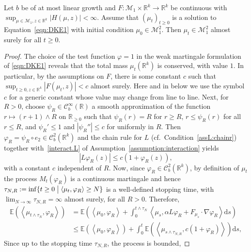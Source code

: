 \documentclass[10pt,a4paper]{amsart}
\newcommand{\C}{\mathcal C}
\newcommand{\E}{\mathbb{E}}
\newcommand{\F}{F}
\newcommand{\R}{\mathbb{R}}
\newcommand{\av}[1]{\left<#1\right>}
\newcommand{\cM}{\mathcal M}
\newcommand{\dd}{\text{d}}
\begin{document}
\begin{lemma}
  \label{lemma:secondmoment}
  Let $b$ be of at most linear growth and $\F\colon\mathcal M_1 \times \R^k \to \R^k$ be continuous with
  $\sup_{\mu \in \mathcal M_1, z \in \R^k} |H(\mu,z)| < \infty$.  Assume that $(\mu_t)_{t \geq 0}$ is a
  solution to Equation~\eqref{eqn:DKE1} with initial condition $\mu_0 \in \cM^2_1$. Then $\mu_t \in \cM^2_1$
  almost surely for all $t \geq 0$.
\end{lemma}

\begin{proof} The choice of the test function $\varphi =1$ in the weak martingale formulation of
  \eqref{eqn:DKE1} reveals that the total mass $\mu_t(\R^k)$ is conserved, with value $1$. In particular, by
  the assumptions on $F$, there is some constant $c$ such that $\sup_{t\geq 0, z \in \R^k} |F(\mu_t,z)| <c$
  almost surely. Here and in below we use the symbol $c$ for a generic constant whose value may change from
  line to line. Next, for $R > 0$, choose $\psi_R \in \C^\infty_b(\R)$ a smooth approximation of the function
  $ r \mapsto (r+1) \wedge R$ on $\R_{\geq 0}$ such that $\psi_R(r) = R$ for $r \geq R$, $r \leq \psi_R(r)$
  for all $r \leq R$, and $ \psi_R' \leq 1$ and $ |\psi_R''| \leq c $ for uniformly in $R$.  Then
  $\varphi_R = \psi_R \circ e_2 \in \C^2_b(\R^k)$ and the chain rule for $L$ (cf.\
  Condition~\ref{assL:chainr}) together with~\ref{interact.L} of Assumption~\ref{assumption:interaction}
  yields
  \begin{equation*}|L \varphi_R(z)| \leq c \left(1 +\varphi_R(z)\right),\end{equation*}
  with a constant $c$ independent of $R$. 
  Now, since $\varphi_R \in \C^2_b(\R^k)$, by definition of $\mu_t$ the process $M_t(\varphi_R)$ is a
  continuous martingale and hence $\tau_{N,R} := \inf\{t \geq 0 \bigm|\av{\mu_t, \varphi_R}\geq N\}$ is a
  well-defined stopping time, with $\lim_{N \to \infty}\tau_{N,R} = \infty$ almost surely, for all $R >
  0$. Therefore,
 \begin{align*}
                \E\left( \av{\mu_{t\wedge\tau_N}, \varphi_R} \right) &= \E\left(\av{\mu_0, \varphi_R} + \int_0^{t\wedge\tau_N} \av{\mu_s, \alpha L\varphi_R+F_{\mu_s} \cdot \nabla \varphi_R}\dd s\right)\\
                &\leq \E\left( \av{\mu_0, \varphi_R} \right) + \int_0^t \E\left( \av{\mu_{s\wedge \tau_{N,R}}, c\left(1+ \varphi_R\right)} \right)\dd s,
\end{align*}
Since up to the stopping time $\tau_{N,R}$, the process is bounded,

\end{proof}
\end{document}
